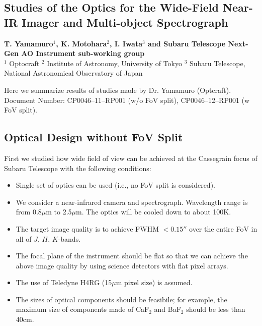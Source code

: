 \def\thisdir{instrument/optics/}

\begin{center}
\section{Studies of the Optics for the Wide-Field Near-IR Imager and
 Multi-object Spectrograph
\label{sec:inst_optics}}
\vspace{0.5cm}

\noindent
\large
{\bf T. Yamamuro$^{1}$, K. Motohara$^{2}$, I. Iwata$^{3}$ and Subaru
Telescope Next-Gen AO Instrument sub-working group}\\
$^1$ Optocraft
$^2$ Institute of Astronomy, University of Tokyo
$^3$ Subaru Telescope, National Astronomical Observatory of Japan
\vspace{0.5cm}

\end{center}

Here we summarize results of studies made by Dr. Yamamuro (Optcraft).
Document Number: CP0046--11--RP001 (w/o FoV split), CP0046--12--RP001 (w
FoV split).

\subsection{Optical Design without FoV Split}

First we studied how wide field of view can be achieved at the
Cassegrain focus of Subaru Telescope with the following conditions:

\begin{itemize}
 \item Single set of optics can be used (i.e., no FoV split is
       considered).
 \item We consider a near-infrared camera and spectrograph. Wavelength
       range is from 0.8$\mu$m to 2.5$\mu$m. The optics will be cooled
       down to about 100K.
 \item The target image quality is to achieve FWHM $<0.15''$ over the
       entire FoV in all of $J$, $H$, $K$-bands.
 \item The focal plane of the instrument should be flat so that we can
       achieve the above image quality by using science detectors with
       flat pixel arrays.
 \item The use of Teledyne H4RG (15$\mu$m pixel size) is assumed.
 \item The sizes of optical components should be feasibile; for example,
       the maximum size of components made of CaF$_2$ and BaF$_2$ should
       be less than 40cm.
\end{itemize}


